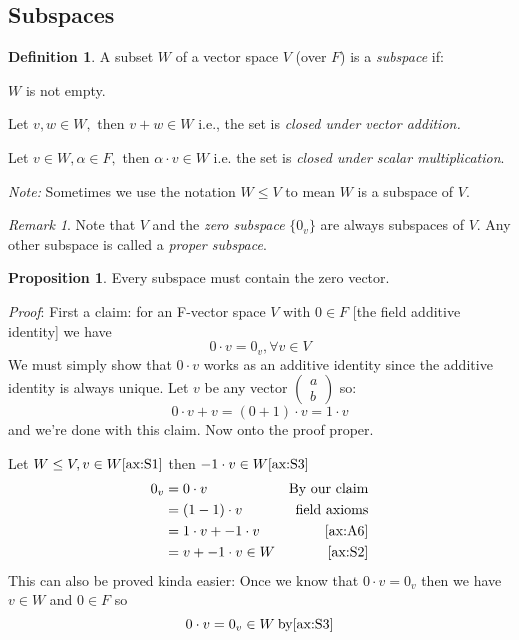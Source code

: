 \documentclass{report}
\makeatletter
\theoremstyle{remark}
\newtheorem{remark}[theorem]{Remark}
\theoremstyle{definition}
\newtheorem{definition}[theorem]{Definition}
\theoremstyle{definition}
\theoremstyle{theorem}
\newtheorem{proposition}[theorem]{Proposition}
\providecommand{\varitem}{} %
\newenvironment{axioms}[1]
 {\renewcommand\varitem[1]{\item[\textbf{#1\arabic{enumi}\rlap{$##1$}.}]%
    \edef\@currentlabel{#1\arabic{enumi}{$##1$}}}%
  \enumerate[label=\textbf{#1\arabic*.}, ref=#1\arabic*]}
 {\endenumerate}
\makeatother
\begin{document}
\subsection{Subspaces}
\begin{definition}
A subset $W$ of a vector space $V$ (over $F$) is a \emph{subspace} if:
\begin{axioms}{S}
    \item $W$ is not empty. \label{ax:S1}
    \item Let $v,w \in W,$ then $ v + w \in W$ i.e., the set is \emph{closed under vector addition.} \label{ax:S2}
    \item Let $v \in W, \alpha \in F,$ then $\alpha \cdot v \in W$ i.e. the set is \emph{closed under scalar multiplication}. \label{ax:S3}
\end{axioms}
\end{definition}
\emph{Note:} Sometimes we use the notation $W \leq V$ to mean $W$ is a subspace of $V$.
\begin{remark}
Note that $V$ and the \emph{zero subspace} $\{0_v\}$ are always subspaces of $V$. Any other subspace is called a \emph{proper subspace}.
\end{remark}
\begin{proposition}
Every subspace must contain the zero vector.
\end{proposition}
\emph{Proof}: First a claim: for an F-vector space $V$ with $0 \in F$ [the field additive identity] we have 
\[0 \cdot v = 0_v, \forall v \in V \]
We must simply show that $0 \cdot v$ works as an additive identity since the additive identity is always unique. Let $v$ be any vector $\begin{pmatrix} a\\b \end{pmatrix}$ so:
\[ 0 \cdot v + v = (0+1) \cdot v = 1 \cdot v \]
and we're done with this claim. Now onto the proof proper. \par
Let $ W \leq V, v \in W \eqref{ax:S1}$ then $-1 \cdot v \in W \eqref{ax:S3}$
\begin{align*}
    0_v&= 0 \cdot v & \text{By our claim}\\
    &= (1-1) \cdot v & \text{field axioms}\\
    &= 1 \cdot v + -1 \cdot v & \eqref{ax:A6}\\
    &= v + -1 \cdot v \in W & \eqref{ax:S2}
\end{align*}
This can also be proved kinda easier: Once we know that $ 0 \cdot v = 0_v$ then we have $ v \in W$ and $0 \in F$ so
\[ 0 \cdot v = 0_v \in W \> \text{by} \eqref{ax:S3}\]
\end{document}
